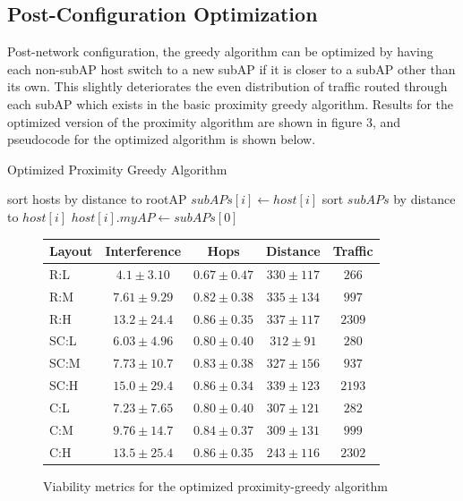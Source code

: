 \documentclass{sigcomm-alternate}
\begin{document}
\subsection{Post-Configuration Optimization}
Post-network configuration, the greedy algorithm can be optimized by having each non-subAP host switch to a new subAP if it is closer to a subAP other than its own. This slightly deteriorates the even distribution of traffic routed through each subAP which exists in the basic proximity greedy algorithm. Results for the optimized version of the proximity algorithm are shown in figure 3, and pseudocode for the optimized algorithm is shown below.

\begin{algorithm}[H]
\caption{Optimized Proximity Greedy Algorithm}
\begin{algorithmic}[H]
\State sort hosts by distance to rootAP
\State $subAPs[i]\gets host[i]$
\EndFor
{}
\State sort $subAPs$ by distance to $host[i]$
\State $host[i].myAP \gets subAPs[0]$
\EndFor
\EndProcedure
\end{algorithmic}
\end{algorithm}

\begin{figure}[H]
  \centering
  
    \begin{tabular}{|l || c | c | c | c|}
    \hline
    Layout & Interference & Hops & Distance & Traffic \\
    \hline
    R:L & $4.1 \pm 3.10$ & $0.67 \pm 0.47$ & $330 \pm 117$ & $266$ \\
    R:M & $7.61 \pm 9.29$ & $0.82 \pm 0.38$ & $335 \pm 134$ & $997$ \\
    R:H & $13.2 \pm 24.4$ & $0.86 \pm 0.35$ & $337 \pm 117$ & $2309$ \\
    \hline
    SC:L & $6.03 \pm 4.96$ & $0.80 \pm 0.40$ & $312 \pm 91$ & $280$ \\
    SC:M & $7.73 \pm 10.7$ & $0.83 \pm 0.38$ & $327 \pm 156$ & $937$ \\
    SC:H & $15.0 \pm 29.4$ & $0.86 \pm 0.34$ & $339 \pm 123$ & $2193$ \\
    \hline
    C:L & $7.23 \pm 7.65$ & $0.80 \pm 0.40$ & $307 \pm 121$ & $282$ \\
    C:M & $9.76 \pm 14.7$ & $0.84 \pm 0.37$ & $309 \pm 131$ & $999$ \\
    C:H & $13.5 \pm 25.4$ & $0.86 \pm 0.35$ & $243 \pm 116$ & $2302$ \\
    \hline
    \end{tabular}
  
  \caption{Viability metrics for the optimized proximity-greedy algorithm}
\end{figure}
\end{document}
